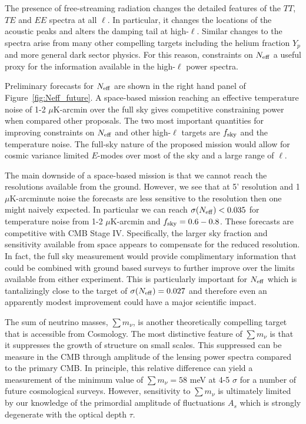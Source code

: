 The presence of free-streaming radiation changes the detailed features of the $TT$, $TE$ and $EE$ spectra at all $\ell$.  In particular, it changes the locations of the acoustic peaks and alters the damping tail at high-$\ell$.  Similar changes to the spectra arise from many other compelling targets including the helium fraction $Y_p$ and more general dark sector physics.  For this reason, constraints on ${N_{\rm eff}}$ a useful proxy for the information available in the high-$\ell$ power spectra.  

Preliminary forecasts for ${N_{\rm eff}}$ are shown in the right hand panel of Figure~\ref{fig:Neff_future}.  A space-based mission reaching an effective temperature noise of 1-2 $\mu$K-arcmin over the full sky gives competitive constraining power when compared other proposals.  The two most important quantities for improving constraints on ${N_{\rm eff}}$ and other high-$\ell$ targets are $f_{\rm sky}$ and the temperature noise.  The full-sky nature of the proposed mission would allow for cosmic variance limited $E$-modes over most of the sky and a large range of $\ell$.

The main downside of a space-based mission is that we cannot reach the resolutions available from the ground.  However, we see that at 5' resolution and 1 $\mu$K-arcminute noise the forecasts are less sensitive to the resolution then one might naively expected.  In particular we can reach $\sigma({N_{\rm eff}}) < 0.035$ for temperature noise from 1-2 $\mu$K-arcmin and $f_{\rm sky} =0.6-0.8$.  These forecasts are competitive with CMB Stage IV.  Specifically, the larger sky fraction and sensitivity available from space appears to compensate for the reduced resolution.  In fact, the full sky measurement would provide complimentary information that could be combined with ground based surveys to further improve over the limits available from either experiment.  This is particularly important for ${N_{\rm eff}}$ which is tantalizingly close to the target of $\sigma({N_{\rm eff}}) =0.027$ and therefore even an apparently modest improvement could have a major scientific impact.  

The sum of neutrino masses, $\sum m_\nu$, is another theoretically compelling target that is accessible from Cosmology.  The most distinctive feature of $\sum m_\nu$ is that it suppresses the growth of structure on small scales.  This suppressed can be measure in the CMB through amplitude of the lensing power spectra compared to the primary CMB.  In principle, this relative difference can yield a measurement  of the minimum value of $\sum m_\nu =58$ meV at 4-5 $\sigma$ for a number of future cosmological surveys.  However, sensitivity to $\sum m_\nu$ is ultimately limited by our knowledge of the primordial amplitude of fluctuations $A_s$ which is strongly degenerate with the optical depth $\tau$. 

